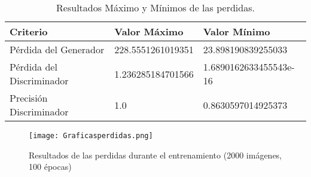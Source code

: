  \begin{table}[H]
  \centering
  \caption{Resultados Máximo y Mínimos de las perdidas.}
  \begin{tabular}{|l|l|l|}
  \hline
  \textbf{Criterio} & \textbf{Valor Máximo} & \textbf{Valor Mínimo}  \\ \hline
  Pérdida del Generador           & 228.5551261019351              & 23.898190839255033     \\
  Pérdida del Discriminador       & 1.236285184701566              & 1.6890162633455543e-16  \\
  Precisión Discriminador         & 1.0                            & 0.8630597014925373       \\ \hline
  \end{tabular}
\end{table}



\begin{figure}[H]
  \begin{center}
    \texttt{[image: Graficasperdidas.png]}
    \caption{Resultados de las perdidas durante el entrenamiento (2000 imágenes, 100 épocas)}
    \label{Alexis10}
  \end{center}
\end{figure}